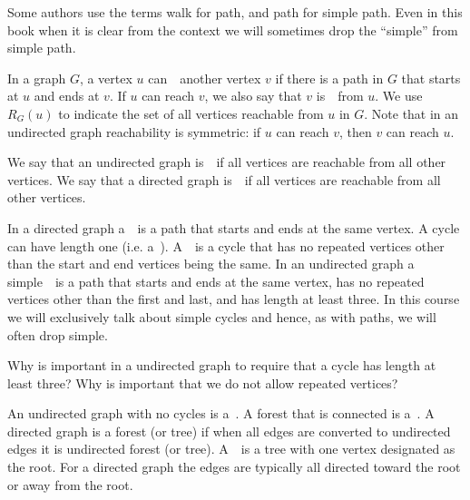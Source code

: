 \begin{remark}
Some authors use the terms walk for path, and path for
simple path.   Even in this book when it is clear from the context
we will sometimes drop the ``simple'' from simple path.
\end{remark}

\begin{definition}
In a graph $G$, a vertex $u$ can~~another vertex $v$
if there is a path in $G$ that starts at $u$ and ends at $v$.
%
If $u$ can reach $v$, we also say that $v$ is~~from $u$.
%
We use $R_G(u)$ to indicate the set of all vertices reachable from $u$
in $G$.
%
Note that in an undirected graph reachability is symmetric: if $u$ can reach $v$, then $v$ can reach $u$.

We say that an undirected graph is~~if all vertices are reachable from all other vertices.  
%
We say that a directed graph is~~if all vertices are reachable from all other vertices.
\end{definition}

\begin{definition}[Cycles]
In a directed graph a~~is a path that starts and ends at
the same vertex.    A cycle can have length one (i.e. a~).
A~~is a
cycle that has no repeated vertices other than the start and end
vertices being the same.
In an undirected graph a simple~~is a path that
starts and ends at the same vertex, has no repeated vertices other
than the first and last, and has length at least three.
In this course we will exclusively talk
about simple cycles and hence, as with paths, we will often drop
simple.
\end{definition}

\begin{exercise}
Why is important in a undirected graph to require that a cycle has
length at least three?  Why is important that we do not allow repeated
vertices?
\end{exercise}

\begin{definition}
An undirected graph with no cycles is a~.
%
A forest that is connected is a~.  
%
A directed graph is a forest (or tree) if when all edges are converted
to undirected edges it is undirected forest (or tree).  
%
A~~is a tree with one vertex designated as the root.
For a directed graph the edges are typically all directed toward the
root or away from the root.
\end{definition}

